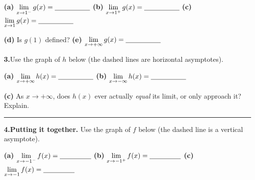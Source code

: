 \documentclass[12pt]{article}
\newcommand{\wl}{\par\vspace{5mm}\noindent\rule{\linewidth}{0.4pt}\par\vspace{1mm}}
\newcommand{\gridaxes}[1]{%
  \draw[step=1,gray!25,very thin] (-#1,-#1) grid (#1,#1);%
  \draw[thick,->] (-#1-0.4,0)--(#1+0.4,0) node[right]{$x$};%
  \draw[thick,->] (0,-#1-0.4)--(0,#1+0.4) node[above]{$y$};%
  \foreach \n in {-#1,...,#1}{\ifnum\n=0\else
      \draw (\n,0.08)--(\n,-0.08) node[below]{\scriptsize$\n$};
      \draw (0.08,\n)--(-0.08,\n) node[left]{\scriptsize$\n$};\fi}%
}
\begin{document}
\textbf{(a)} $\displaystyle\lim_{x \to 1^-} g(x) = \underline{\hspace{1.8cm}}$\quad
\textbf{(b)} $\displaystyle\lim_{x \to 1^+} g(x) = \underline{\hspace{1.8cm}}$\quad
\textbf{(c)} $\displaystyle\lim_{x \to 1} g(x) = \underline{\hspace{1.8cm}}$

\medskip
\textbf{(d)} Is $g(1)$ defined? \underline{\hspace{2.5cm}}\quad
\textbf{(e)} $\displaystyle\lim_{x \to +\infty} g(x) = \underline{\hspace{1.8cm}}$

\newpage
\textbf{3.}\quad Use the graph of $h$ below (the dashed lines are horizontal asymptotes).

\begin{center}
\end{center}

\textbf{(a)} $\displaystyle\lim_{x \to +\infty} h(x) = \underline{\hspace{1.8cm}}$\quad
\textbf{(b)} $\displaystyle\lim_{x \to -\infty} h(x) = \underline{\hspace{1.8cm}}$

\medskip
\textbf{(c)} As $x \to +\infty$, does $h(x)$ ever actually \emph{equal} its limit, or only approach it? Explain.
\wl

\bigskip
\newpage
\textbf{4.}\quad \textbf{Putting it together.} Use the graph of $f$ below (the dashed line is a vertical
asymptote).

\begin{center}
\end{center}

\textbf{(a)} $\displaystyle\lim_{x \to -1^-} f(x) = \underline{\hspace{1.6cm}}$\quad
\textbf{(b)} $\displaystyle\lim_{x \to -1^+} f(x) = \underline{\hspace{1.6cm}}$\quad
\textbf{(c)} $\displaystyle\lim_{x \to -1} f(x) = \underline{\hspace{1.6cm}}$
\end{document}
